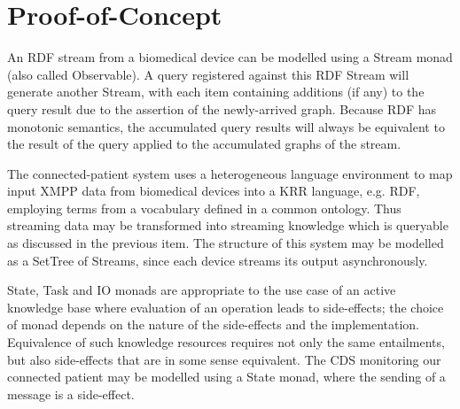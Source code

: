 \documentclass[runningheads]{llncs}
\begin{document}

\vspace{-0.4cm}
\section{Proof-of-Concept}
\label{sec:proof}

An RDF stream from a biomedical device can be modelled using a Stream monad (also called Observable).
A query registered against this RDF Stream will generate another Stream, with each item containing additions (if any) to the query result due to the assertion of the newly-arrived graph.
Because RDF has monotonic semantics, the accumulated query results will always be equivalent to the result of the query applied to the accumulated graphs of the stream.


The connected-patient system uses a heterogeneous language environment to map input XMPP data from biomedical devices into a KRR language, e.g. RDF, employing terms from a vocabulary defined in a common ontology. Thus streaming data may be transformed into streaming knowledge which is queryable as discussed in the previous item. The structure of this system may be modelled as a SetTree of Streams, since each device streams its output asynchronously.

State, Task and IO monads are appropriate to the use case of an active knowledge base where evaluation of an operation leads to side-effects; the choice of monad depends on the nature of the side-effects and the implementation.
Equivalence of such knowledge resources requires not only the same entailments, but also side-effects that are in some sense equivalent.
The CDS monitoring our connected patient may be modelled using a State monad, where the sending of a message is a side-effect.
\end{document}
